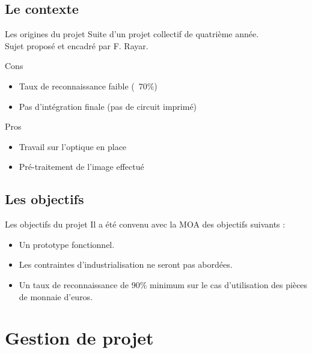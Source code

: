 \documentclass{beamer}
\begin{document}
\subsection{Le contexte}

\begin{frame}{Les origines du projet}
Suite d'un projet collectif de quatrième année.\\
Sujet proposé et encadré par F. Rayar.

\begin{block}{Cons}
\begin{itemize}
    \item Taux de reconnaissance faible (~70\%)
    \item Pas d'intégration finale (pas de circuit imprimé)
\end{itemize}
\end{block}
\begin{block}{Pros}
\begin{itemize}
    \item Travail sur l'optique en place
    \item Pré-traitement de l'image effectué
\end{itemize}
\end{block}

\end{frame}

\subsection{Les objectifs}
\begin{frame}{Les objectifs du projet}
Il a été convenu avec la MOA des objectifs suivants :
\begin{itemize}
    \item Un \alert{prototype fonctionnel}.
    \item Les contraintes d'industrialisation ne seront \alert{pas} abordées.
    \item Un taux de reconnaissance de \alert{90\% minimum} sur le cas d'utilisation des pièces de monnaie d'euros.
\end{itemize}
\end{frame}

\section{Gestion de projet}
\end{document}
